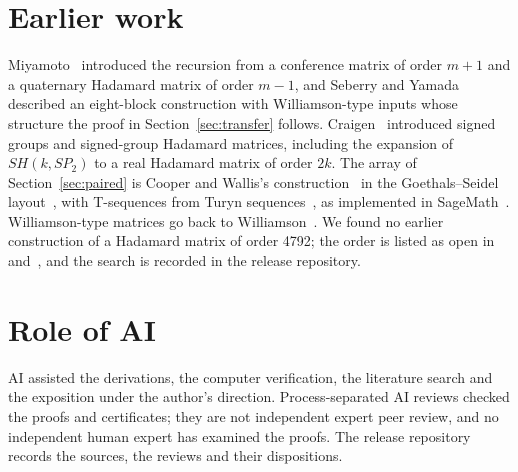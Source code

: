 \documentclass[10pt]{article}
\theoremstyle{definition}
\theoremstyle{remark}
\begin{document}
\section{Earlier work}\label{sec:earlier}
Miyamoto~\cite{Mi91} introduced the recursion from a conference matrix of order $m+1$ and a quaternary Hadamard matrix of order $m-1$, and Seberry and Yamada~\cite[Lemma~8.12 and Corollary~8.14]{SY92} described an eight-block construction with Williamson-type inputs whose structure the proof in Section~\ref{sec:transfer} follows. Craigen~\cite{Cr95} introduced signed groups and signed-group Hadamard matrices, including the expansion of $SH(k,SP_2)$ to a real Hadamard matrix of order $2k$. The array of Section~\ref{sec:paired} is Cooper and Wallis's construction~\cite{CW72} in the Goethals--Seidel layout~\cite{GS70}, with T-sequences from Turyn sequences~\cite{Tu74,KTR05}, as implemented in SageMath~\cite{Sage}. Williamson-type matrices go back to Williamson~\cite{Wi44}. We found no earlier construction of a Hadamard matrix of order 4792; the order is listed as open in~\cite{EKLO} and~\cite{U61}, and the search is recorded in the release repository.

\section{Role of AI}\label{sec:ai}
AI assisted the derivations, the computer verification, the literature search and the exposition under the author's direction. Process-separated AI reviews checked the proofs and certificates; they are not independent expert peer review, and no independent human expert has examined the proofs. The release repository records the sources, the reviews and their dispositions.
\end{document}
